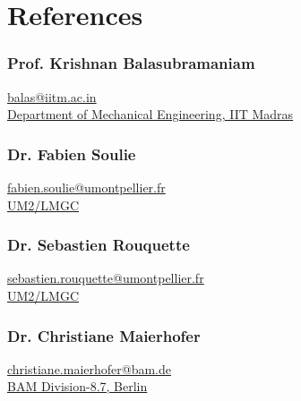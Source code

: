 \documentclass{my_cv}%
\begin{document}
\section{References}
\vspace{1em}
\begin{minipage}{0.6\textwidth}
\subsubsection{Prof. Krishnan Balasubramaniam} 
\faAt \hspace{0.2em} \href{mailto:balas@iitm.ac.in}{balas@iitm.ac.in} \\
\hspace{0.5em} \faInstitution \hspace{0.2em} \href{http://iitm.irins.org/profile/50968}{Department of Mechanical Engineering, IIT Madras}
\vspace{1.5em}
\subsubsection{Dr. Fabien Soulie} 
\faAt \hspace{0.2em} \href{mailto:fabien.soulie@umontpellier.fr}{fabien.soulie@umontpellier.fr}\\ \hspace{0.2em}\faInstitution \hspace{0.2em}  \href{http://www.lmgc.univ-montp2.fr/spip.php?page=pageperso&nom=SOULIE&prenom=Fabien&lang=fr}{UM2/LMGC}
\vspace{1em}
\end{minipage}
\begin{minipage}{0.6\textwidth}
\subsubsection{Dr. Sebastien Rouquette} 
\faAt \hspace{0.2em} \href{mailto:sebastien.rouquette@umontpellier.fr}{sebastien.rouquette@umontpellier.fr}\\ \faInstitution \hspace{0.2em} \href{http://www.lmgc.univ-montp2.fr/spip.php?page=pageperso&nom=ROUQUETTE&prenom=Sebastien&lang=fr}{UM2/LMGC}
\vspace{1.2em}
\subsubsection{Dr. Christiane Maierhofer} 
\faAt \hspace{0.2em} \href{mailto:christiane.maierhofer@bam.de}{christiane.maierhofer@bam.de}\\ 
\faInstitution \hspace{0.2em}   \href{https://www.bam.de/Navigation/EN/About-us/Organisation/Organisation-Chart/President/Department-8/Division-87/division87.html}{BAM Division-8.7, Berlin}
\end{minipage}
\end{document}
